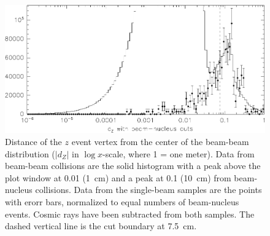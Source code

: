 \documentclass{cornell}
\begin{document}
\begin{figure}[p]
  \begin{center}
    \includegraphics[width=\linewidth]{plots/dxydzcontaminationb}
  \end{center}
  \caption{\label{dxydzcontaminationb} Distance of the $z$ event
  vertex from the center of the beam-beam distribution ($|d_Z|$ in
  $\log x$-scale, where 1 = one meter).  Data from beam-beam
  collisions are the solid histogram with a peak above the plot window
  at 0.01 (1~cm) and a peak at 0.1 (10~cm) from beam-nucleus
  collisions.  Data from the single-beam samples are the points with
  erorr bars, normalized to equal numbers of beam-nucleus events.
  Cosmic rays have been subtracted from both samples.  The dashed
  vertical line is the cut boundary at 7.5~cm.}
\end{figure}
\end{document}
